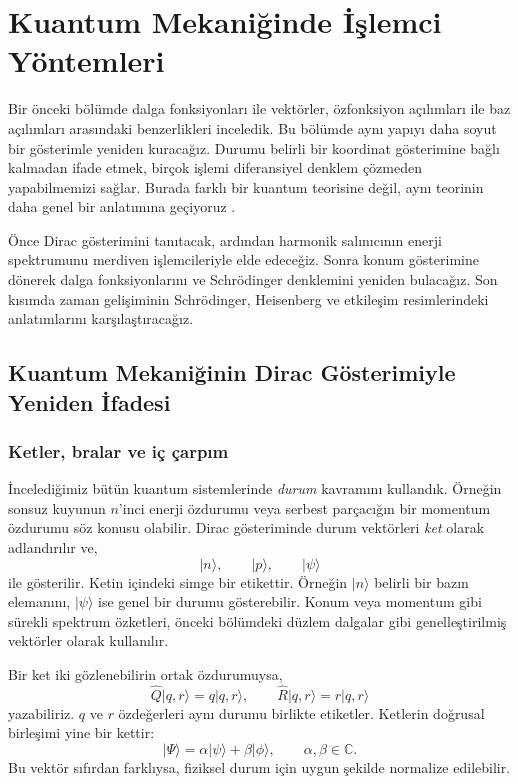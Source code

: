 \documentclass[00_kitap.tex]{subfiles}
\begin{document}
\BolumKaynakcaBaslat

\setcounter{section}{5}
\section{Kuantum Mekaniğinde İşlemci Yöntemleri}
\label{sec:06_islemci_yontemleri}

Bir önceki bölümde dalga fonksiyonları ile vektörler, özfonksiyon
açılımları ile baz açılımları arasındaki benzerlikleri inceledik.
Bu bölümde aynı yapıyı daha soyut bir gösterimle yeniden kuracağız.
Durumu belirli bir koordinat gösterimine bağlı kalmadan ifade etmek,
birçok işlemi diferansiyel denklem çözmeden yapabilmemizi sağlar.
Burada farklı bir kuantum teorisine değil, aynı teorinin daha genel
bir anlatımına geçiyoruz \cite{book:Gasiorowicz}.

Önce Dirac gösterimini tanıtacak, ardından harmonik salınıcının
enerji spektrumunu merdiven işlemcileriyle elde edeceğiz. Sonra konum
gösterimine dönerek dalga fonksiyonlarını ve Schrödinger denklemini
yeniden bulacağız. Son kısımda zaman gelişiminin Schrödinger,
Heisenberg ve etkileşim resimlerindeki anlatımlarını karşılaştıracağız.

\subsection{Kuantum Mekaniğinin Dirac Gösterimiyle Yeniden İfadesi}
\label{sec:06_dirac}

\subsubsection{Ketler, bralar ve iç çarpım}

İncelediğimiz bütün kuantum sistemlerinde \emph{durum} kavramını
kullandık. Örneğin sonsuz kuyunun $n$'inci enerji özdurumu veya
serbest parçacığın bir momentum özdurumu söz konusu olabilir.
Dirac gösteriminde durum vektörleri \emph{ket} olarak adlandırılır ve,
\begin{equation}
 |n\rangle,\qquad |p\rangle,\qquad |\psi\rangle
\end{equation}
ile gösterilir. Ketin içindeki simge bir etikettir. Örneğin
$|n\rangle$ belirli bir bazın elemanını, $|\psi\rangle$ ise genel
bir durumu gösterebilir. Konum veya momentum gibi sürekli spektrum
özketleri, önceki bölümdeki düzlem dalgalar gibi genelleştirilmiş
vektörler olarak kullanılır.

Bir ket iki gözlenebilirin ortak özdurumuysa,
\begin{equation}
 \hat Q|q,r\rangle=q|q,r\rangle,\qquad
 \hat R|q,r\rangle=r|q,r\rangle
\end{equation}
yazabiliriz. $q$ ve $r$ özdeğerleri aynı durumu birlikte etiketler.
Ketlerin doğrusal birleşimi yine bir kettir:
\begin{equation}
 |\Psi\rangle=\alpha|\psi\rangle+\beta|\phi\rangle,
 \qquad \alpha,\beta\in\mathbb C.
 \label{eq:06_superpozisyon}
\end{equation}
Bu vektör sıfırdan farklıysa, fiziksel durum için uygun şekilde
normalize edilebilir.
\end{document}
